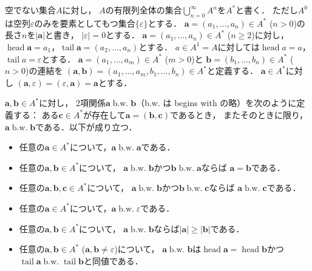 \documentclass{ltjsarticle}
\newcommand\bw{\mathrel{\text{b.w.}}}
\DeclareMathOperator\head{head}
\DeclareMathOperator\tail{tail}
\begin{document}
空でない集合$A$に対し，
$A$の有限列全体の集合$\bigcup_{n = 0}^\infty A^n$を$A^*$と書く．
ただし$A^0$は空列$\varepsilon$のみを要素としてもつ集合$\{ \varepsilon \}$とする．
$\boldsymbol{a} = (a_1, \dotsc, a_n) \in A^*$ ($n > 0$)の長さ$n$を$\lvert\boldsymbol{a}\rvert$と書き，
$\lvert\varepsilon\rvert = 0$とする．
$\boldsymbol{a} = (a_1, \dotsc, a_n) \in A^*$ ($n \ge 2$)に対し，$\head\boldsymbol{a} = a_1$，$\tail\boldsymbol{a} = (a_2, \dotsc, a_n)$とする．
$a \in A^1 = A$に対しては$\head a = a$，$\tail a = \varepsilon$とする．
$\boldsymbol{a} = (a_1, \dotsc, a_m) \in A^*$ ($m > 0$)と
$\boldsymbol{b} = (b_1, \dotsc, b_n) \in A^*$ ($n > 0$)の連結を
$(\boldsymbol{a}, \boldsymbol{b}) = (a_1, \dotsc, a_m, b_1, \dotsc, b_n) \in A^*$と定義する．
$\boldsymbol{a} \in A^*$に対し
$(\boldsymbol{a}, \varepsilon) = (\varepsilon, \boldsymbol{a}) = \boldsymbol{a}$とする．

$\boldsymbol{a}, \boldsymbol{b} \in A^*$に対し，
2項関係$\boldsymbol{a} \bw \boldsymbol{b}$（b.w. は begins with の略）を次のように定義する：
ある$\boldsymbol{c} \in A^*$が存在して$\boldsymbol{a} = (\boldsymbol{b}, \boldsymbol{c})$であるとき，
またそのときに限り，$\boldsymbol{a} \bw \boldsymbol{b}$である．以下が成り立つ．
\begin{itemize}
  \item 任意の$\boldsymbol{a} \in A^*$について，$\boldsymbol{a} \bw \boldsymbol{a}$である．
  \item 任意の$\boldsymbol{a}, \boldsymbol{b} \in A^*$について，
    $\boldsymbol{a} \bw \boldsymbol{b}$かつ$\boldsymbol{b} \bw \boldsymbol{a}$ならば
    $\boldsymbol{a} = \boldsymbol{b}$である．
  \item 任意の$\boldsymbol{a}, \boldsymbol{b}, \boldsymbol{c} \in A^*$について，
    $\boldsymbol{a} \bw \boldsymbol{b}$かつ$\boldsymbol{b} \bw \boldsymbol{c}$ならば
    $\boldsymbol{a} \bw \boldsymbol{c}$である．
  \item 任意の$\boldsymbol{a} \in A^*$について，$\boldsymbol{a} \bw \varepsilon$である．
  \item 任意の$\boldsymbol{a}, \boldsymbol{b} \in A^*$について，
    $\boldsymbol{a} \bw \boldsymbol{b}$ならば$\lvert\boldsymbol{a}\rvert \ge \lvert\boldsymbol{b}\rvert$である．
  \item 任意の$\boldsymbol{a}, \boldsymbol{b} \in A^*$ ($\boldsymbol{a}, \boldsymbol{b} \ne \varepsilon$)について，
    $\boldsymbol{a} \bw \boldsymbol{b}$は$\head\boldsymbol{a} = \head\boldsymbol{b}$かつ$\tail\boldsymbol{a} \bw \tail\boldsymbol{b}$と同値である．
\end{itemize}
\end{document}
